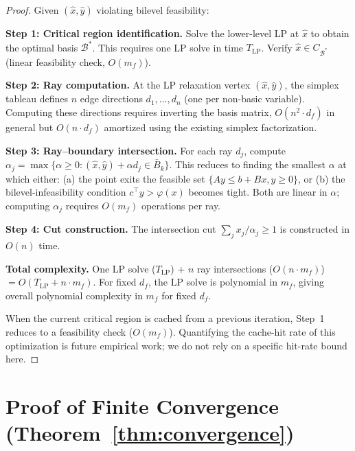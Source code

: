\documentclass[11pt]{article}
\begin{document}
\begin{proof}
Given $(\hat{x}, \hat{y})$ violating bilevel feasibility:

\textbf{Step 1: Critical region identification.}
Solve the lower-level LP at $\hat{x}$ to obtain the optimal basis
$\mathcal{B}^*$. This requires one LP solve in time $T_{\text{LP}}$.
Verify $\hat{x} \in C_{\mathcal{B}^*}$ (linear feasibility check, $O(m_f)$).

\textbf{Step 2: Ray computation.}
At the LP relaxation vertex $(\hat{x}, \hat{y})$, the simplex tableau
defines $n$ edge directions $d_1, \ldots, d_n$ (one per non-basic variable).
Computing these directions requires inverting the basis matrix,
$O(n^2 \cdot d_f)$ in general but $O(n \cdot d_f)$ amortized using the
existing simplex factorization.

\textbf{Step 3: Ray--boundary intersection.}
For each ray $d_j$, compute
$\alpha_j = \max\{\alpha \geq 0 : (\hat{x}, \hat{y}) + \alpha d_j \in \bar{B}_k\}$.
This reduces to finding the smallest $\alpha$ at which either:
(a) the point exits the feasible set $\{Ay \leq b + Bx, y \geq 0\}$, or
(b) the bilevel-infeasibility condition $c^\top y > \varphi(x)$ becomes
tight.
Both are linear in $\alpha$; computing $\alpha_j$ requires $O(m_f)$
operations per ray.

\textbf{Step 4: Cut construction.}
The intersection cut $\sum_j x_j / \alpha_j \geq 1$ is constructed in
$O(n)$ time.

\textbf{Total complexity.}
One LP solve ($T_{\text{LP}}$) + $n$ ray intersections ($O(n \cdot m_f)$)
$= O(T_{\text{LP}} + n \cdot m_f)$.
For fixed $d_f$, the LP solve is polynomial in $m_f$, giving overall
polynomial complexity in $m_f$ for fixed $d_f$.

When the current critical region is cached from a previous iteration,
Step~1 reduces to a feasibility check ($O(m_f)$). Quantifying the cache-hit
rate of this optimization is future empirical work; we do not rely on a
specific hit-rate bound here.
\end{proof}

\section{Proof of Finite Convergence (Theorem~\ref{thm:convergence})}
\label{app:convergence}
\end{document}
